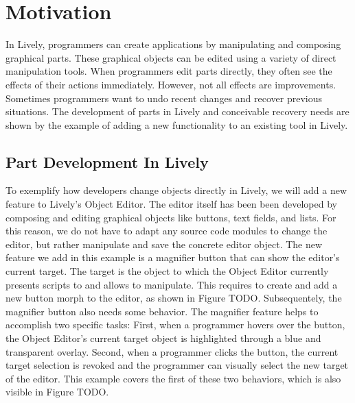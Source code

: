 \chapter{Motivation} \label{chapter:MOTIVATION}

In Lively, programmers can create applications by manipulating and composing graphical parts.
These graphical objects can be edited using a variety of direct manipulation tools.
When programmers edit parts directly, they often see the effects of their actions immediately.
However, not all effects are improvements.
Sometimes programmers want to undo recent changes and recover previous situations.
The development of parts in Lively and conceivable recovery needs are shown by the example of adding a new functionality to an existing tool in Lively.


\section{Part Development In Lively}

To exemplify how developers change objects directly in Lively, we will add a new feature to Lively's Object Editor.
The editor itself has been been developed by composing and editing graphical objects like buttons, text fields, and lists.
For this reason, we do not have to adapt any source code modules to change the editor, but rather manipulate and save the concrete editor object.
The new feature we add in this example is a magnifier button that can show the editor's current target.
The target is the object to which the Object Editor currently presents scripts to and allows to manipulate.
This requires to create and add a new button morph to the editor, as shown in Figure TODO.
Subsequentely, the magnifier button also needs some behavior.
The magnifier feature helps to accomplish two specific tasks: First, when a programmer hovers over the button, the Object Editor's current target object is highlighted through a blue and transparent overlay. Second, when a programmer clicks the button, the current target selection is revoked and the programmer can visually select the new target of the editor.
This example covers the first of these two behaviors, which is also visible in Figure TODO.




